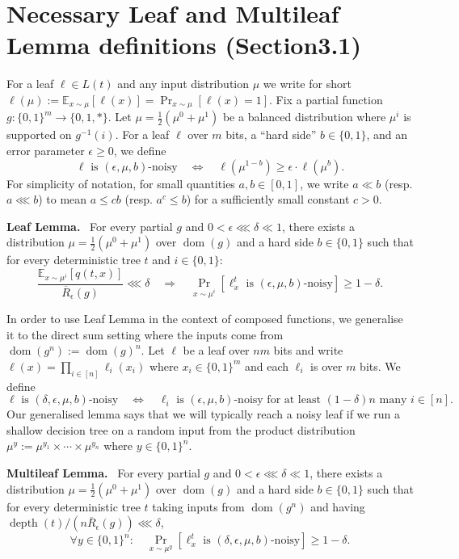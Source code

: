 \documentclass[10pt,a4paper]{article}
\newenvironment{authorclaim}[1]{\par\medskip\noindent\textbf{#1.}\ }{\par\medskip}
\begin{document}
\section*{Necessary Leaf and Multileaf Lemma definitions (Section3.1)}
For a leaf $\ell\in L(t)$ and any input distribution $\mu$ we write for short $\ell(\mu):=\mathbb E_{x\sim\mu}[\ell(x)]=\Pr_{x\sim\mu}[\ell(x)=1]$.
Fix a partial function $g:\{0,1\}^m\to\{0,1,*\}$. Let $\mu=\frac12(\mu^0+\mu^1)$ be a balanced distribution where $\mu^i$ is supported on $g^{-1}(i)$. For a leaf $\ell$ over $m$ bits, a ``hard side'' $b\in\{0,1\}$, and an error parameter $\epsilon\ge0$, we define
\[\ell\text{ is }(\epsilon,\mu,b)\text{-noisy}\quad\Longleftrightarrow\quad\ell(\mu^{1-b})\ge\epsilon\cdot\ell(\mu^b).\]
For simplicity of notation, for small quantities $a,b\in[0,1]$, we write $a\ll b$ (resp. $a\lll b$) to mean $a\le cb$ (resp. $a^c\le b$) for a sufficiently small constant $c>0$.
\begin{authorclaim}{Leaf Lemma}
For every partial $g$ and $0<\epsilon\lll\delta\ll1$, there exists a distribution $\mu=\frac12(\mu^0+\mu^1)$ over $\operatorname{dom}(g)$ and a hard side $b\in\{0,1\}$ such that for every deterministic tree $t$ and $i\in\{0,1\}$:
\[\frac{\mathbb E_{x\sim\mu^i}[q(t,x)]}{\overline R_\epsilon(g)}\lll\delta\quad\Longrightarrow\quad\Pr_{x\sim\mu^i}[\ell_x^t\text{ is }(\epsilon,\mu,b)\text{-noisy}]\ge1-\delta.\]
\end{authorclaim}
In order to use Leaf Lemma in the context of composed functions, we generalise it to the direct sum setting where the inputs come from $\operatorname{dom}(g^n):=\operatorname{dom}(g)^n$. Let $\ell$ be a leaf over $nm$ bits and write $\ell(x)=\prod_{i\in[n]}\ell_i(x_i)$ where $x_i\in\{0,1\}^m$ and each $\ell_i$ is over $m$ bits. We define
\[\ell\text{ is }(\delta,\epsilon,\mu,b)\text{-noisy}\quad\Longleftrightarrow\quad\ell_i\text{ is }(\epsilon,\mu,b)\text{-noisy for at least }(1-\delta)n\text{ many }i\in[n].\]
Our generalised lemma says that we will typically reach a noisy leaf if we run a shallow decision tree on a random input from the product distribution $\mu^y:=\mu^{y_1}\times\cdots\times\mu^{y_n}$ where $y\in\{0,1\}^n$.
\begin{authorclaim}{Multileaf Lemma}
For every partial $g$ and $0<\epsilon\lll\delta\ll1$, there exists a distribution $\mu=\frac12(\mu^0+\mu^1)$ over $\operatorname{dom}(g)$ and a hard side $b\in\{0,1\}$ such that for every deterministic tree $t$ taking inputs from $\operatorname{dom}(g^n)$ and having $\operatorname{depth}(t)/(n\overline R_\epsilon(g))\lll\delta$,
\[\forall y\in\{0,1\}^n:\quad\Pr_{x\sim\mu^y}[\ell_x^t\text{ is }(\delta,\epsilon,\mu,b)\text{-noisy}]\ge1-\delta.\]
\end{authorclaim}
\end{document}
